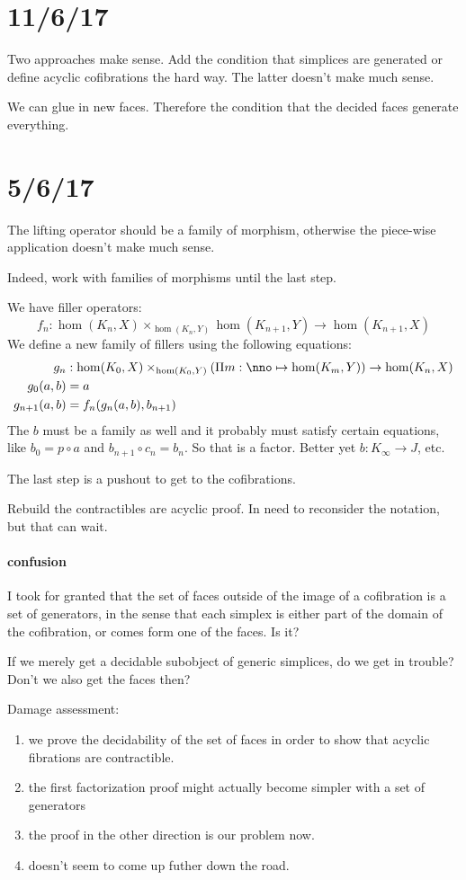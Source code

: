 \documentclass{tac}
\newcommand\of{:}
\newcommand\product[2]{\Pi #1 \mapsto #2}
\begin{document}
\section{11/6/17}
Two approaches make sense. Add the condition that simplices are
generated or define acyclic cofibrations the hard way.
The latter doesn't make much sense.

We can glue in new faces. Therefore the condition that the decided
faces generate everything.

\section{5/6/17}
The lifting operator should be a family of morphism, otherwise
the piece-wise application doesn't make much sense.

Indeed, work with families of morphisms until the last step.

We have filler operators:
\[ f_n\of \hom(K_n,X)\times_{\hom(K_n,Y)}\hom(K_{n+1},Y) \to \hom(K_{n+1},X) \]
We define a new family of fillers using the following equations:
\begin{align*}
g_n &\of \hom(K_0,X)\times_{\hom(K_0,Y)}(\product{m\of\nno}\hom(K_m,Y))\to \hom(K_n,X)\\
g_0(a,b) &= a\\
g_{n+1}(a,b) &= f_n(g_n(a,b),b_{n+1})
\end{align*}
The $b$ must be a family as well and it probably must satisfy certain equations, like $b_0 = p\circ a$ and $b_{n+1}\circ c_n = b_n$.
So that is a factor.
Better yet $b\of K_\infty \to J$, etc.

The last step is a pushout to get to the cofibrations.

Rebuild the contractibles are acyclic proof. In need to reconsider the notation, but that can wait.

\paragraph{confusion}
I took for granted that the set of faces outside of the image of a cofibration is a set of generators, in the sense that each simplex is either part of the domain of the cofibration, or comes form one of the faces. Is it?

If we merely get a decidable subobject of generic simplices, do we get in trouble? Don't we also get the faces then?

Damage assessment:
\begin{enumerate}
\item we prove the decidability of the set of faces in order to show that acyclic fibrations are contractible.
\item the first factorization proof might actually become simpler
with a set of generators
\item the proof in the other direction is our problem now.
\item doesn't seem to come up futher down the road.
\end{enumerate}
\end{document}
